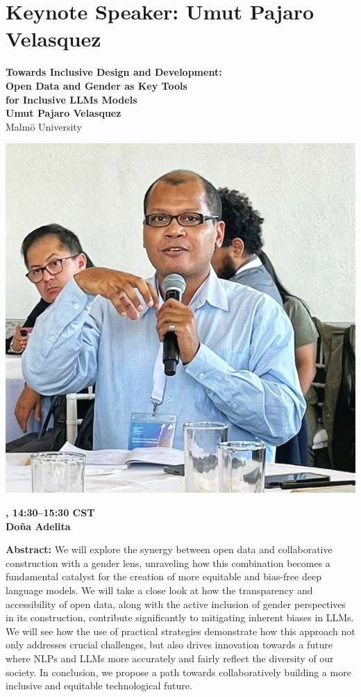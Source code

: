 \newpage
\section{Keynote Speaker: Umut Pajaro Velasquez}

\begin{center}
{\bfseries\Large Towards Inclusive Design and Development:\\\vspace{2.0\lineskip}Open Data and Gender as Key Tools\\\vspace{2.0\lineskip}for Inclusive LLMs Models} \\
\vspace{1.0em}
{\large\bf Umut Pajaro Velasquez} \\
Malm\"o University

\includegraphics[width=0.4\linewidth]{content/mexican_nlp/umut.png}

\textbf{\daydateyear{}, 14:30--15:30 CST}\\
\textbf{Do\~na Adelita}
\end{center}

\noindent
{\bfseries Abstract:}
We will explore the synergy between open data and collaborative construction with a gender lens, unraveling how this combination becomes a fundamental catalyst for the creation of more equitable and bias-free deep language models. We will take a close look at how the transparency and accessibility of open data, along with the active inclusion of gender perspectives in its construction, contribute significantly to mitigating inherent biases in LLMs. We will see how the use of practical strategies demonstrate how this approach not only addresses crucial challenges, but also drives innovation towards a future where NLPs and LLMs more accurately and fairly reflect the diversity of our society. In conclusion, we propose a path towards collaboratively building a more inclusive and equitable technological future.

